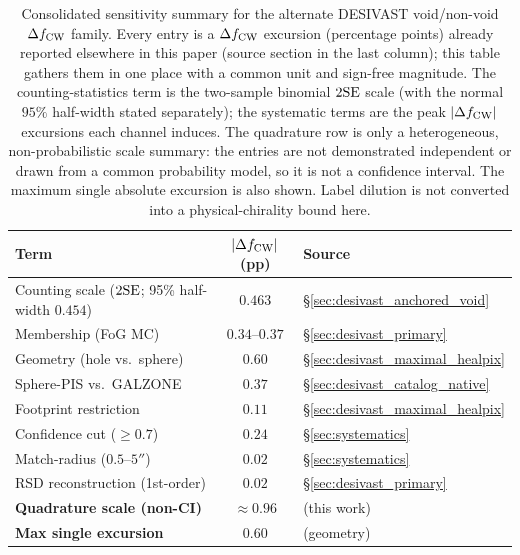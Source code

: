 \documentclass[aps,prd,twocolumn,superscriptaddress,showpacs,preprintnumbers,nofootinbib,longbibliography,floatfix]{revtex4-2}
\begin{document}
\begin{table}[ht]
\caption{Consolidated sensitivity summary for the alternate DESIVAST
void/non-void $\Delta f_{\rm CW}$ family. Every entry is a
$\Delta f_{\rm CW}$ excursion (percentage points) already reported
elsewhere in this paper (source section in the last column); this table
gathers them in one place with a common unit and sign-free magnitude.
The counting-statistics term is the two-sample binomial $2{\rm SE}$
scale (with the normal $95\%$ half-width stated separately); the systematic terms are the peak $|\Delta f_{\rm CW}|$
excursions each channel induces. The quadrature row is only a
heterogeneous, non-probabilistic scale summary: the entries are not
demonstrated independent or drawn from a common probability model, so it
is not a confidence interval. The maximum single absolute excursion is
also shown. Label dilution is not converted into a physical-chirality
bound here.}
\label{tab:systematic_budget}
{\small
\begin{ruledtabular}
\begin{tabular}{lcl}
Term & $|\Delta f_{\rm CW}|$ (pp) & Source \\
\hline
Counting scale ($2{\rm SE}$; 95\% half-width $0.454$) & $0.463$ & \S\ref{sec:desivast_anchored_void} \\
Membership (FoG MC)              & $0.34$--$0.37$ & \S\ref{sec:desivast_primary} \\
Geometry (hole vs.\ sphere)      & $0.60$ & \S\ref{sec:desivast_maximal_healpix} \\
Sphere-PIS vs.\ GALZONE          & $0.37$ & \S\ref{sec:desivast_catalog_native} \\
Footprint restriction            & $0.11$ & \S\ref{sec:desivast_maximal_healpix} \\
Confidence cut ($\ge 0.7$)       & $0.24$ & \S\ref{sec:systematics} \\
Match-radius ($0.5$--$5''$)      & $0.02$ & \S\ref{sec:systematics} \\
RSD reconstruction (1st-order)   & $0.02$ & \S\ref{sec:desivast_primary} \\
\hline
\textbf{Quadrature scale (non-CI)} & $\approx 0.96$ & (this work) \\
\textbf{Max single excursion}    & $0.60$ & (geometry) \\
\end{tabular}
\end{ruledtabular}
}
\end{table}
\fi
\end{document}
